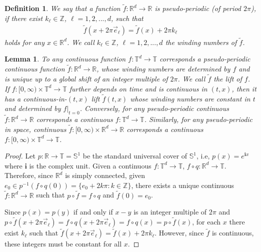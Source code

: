 \documentclass[a4paper,11pt]{amsart}
\newtheorem{definition}[theorem]{Definition}
\newtheorem{lemma}[theorem]{Lemma}
\newcommand{\red}[1]{{#1}}
\newcommand{\R}{\mathbb{R}}
\newcommand{\T}{\mathbb{T}}
\newcommand{\Z}{\mathbb{Z}}
\newcommand{\fran}[1]{{\color{green}#1}}{}
\numberwithin{equation}{section}
\numberwithin{theorem}{section}
\theoremstyle{definition}
\begin{document}
\red{
\begin{definition}\label{def:pseudo}
    We say that a function $\tilde f:\R^d\to\R$ is {\it{pseudo-periodic}} (of period $2\pi$), if there exist $k_\ell\in\Z$, $\ell=1,2,...,d$, such that 
    \begin{align}\label{eq:pseudo-periodic}
    \tilde f(x+2\pi \vec e_\ell)= \tilde f(x)+ 2\pi k_\ell
    \end{align}
    holds for any $x\in\R^d$. We call $k_\ell\in\Z$, $\ell=1,2,...,d$ the winding numbers of $\tilde f$.
\end{definition}

\begin{lemma}\label{lem:winding}
    To any continuous function $f:\T^d\to \mathbb T$ corresponds a pseudo-periodic continuous function $\tilde f:\R^d\to\R$, whose winding numbers are determined by $f$ and is  unique up to a global shift of an integer multiple of $2\pi$. We call $\tilde f$ the lift of $f$. If $f:[0,\infty)\times\T^d\to\mathbb T$ further depends on time and is continuous in $(t,x)$, then it has a continuous-in-$(t,x)$ lift $\tilde f(t,x)$ whose winding numbers are constant in $t$ and determined by $f|_{t=0}$. Conversely, for any pseudo-periodic continuous $\tilde f:\mathbb{R}^d \to \mathbb{R}$ corresponds a continuous $f:\mathbb{T}^d \to \mathbb{T}$. Similarly, for any pseudo-periodic in space, continuous $\tilde f:[0,\infty) \times \mathbb{R}^d \to \mathbb{R}$ corresponds a continuous $f:[0,\infty) \times \mathbb{T}^d \to \mathbb{T}$. 
\end{lemma}
\begin{proof}


Let $p:\mathbb{R} \to \mathbb{T} = \mathbb S^1$ be the standard universal cover of $\mathbb S^1$, i.e, $p(x) = e^{\mathbf ix}$ where $\mathbf i$ is the complex unit. Given a continuous $f:\mathbb{T}^d \to \mathbb{T}$, $f\circ q:\mathbb{R}^d \to \mathbb{T}$. Therefore, since $\mathbb{R}^d$ is simply connected, given $e_0 \in p^{-1}(f \circ q(0)) = \{e_0  + 2k\pi : k \in \mathbb{Z}\}$, there exists a unique continuous $\tilde f:\mathbb{R}^d \to \mathbb{R}$ such that $p \circ \tilde f = f \circ q$ and $\tilde f(0) = e_0$. 

Since $p(x) = p(y)$ if and only if $x-y$ is an integer multiple of $2\pi$ and $p\circ \tilde f(x+2\pi \vec e_\ell) = f \circ q(x+2\pi \vec e_\ell) = f \circ q(x) =p \circ \tilde f(x)$, for each $x$ there exist $k_\ell$ such that $\tilde f(x + 2\pi\vec e_\ell) = \tilde f(x) + 2\pi k_\ell$. However, since $\tilde f$ is continuous, these integers must be constant for all $x$.


\end{proof}}
\end{document}
